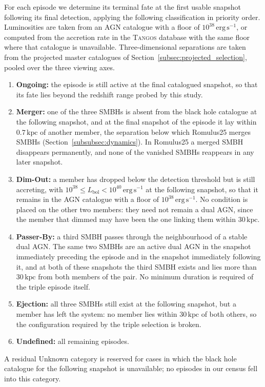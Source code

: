 \documentclass[twocolumn, 10pt]{article}
\begin{document}
For each episode we determine its terminal fate at the first usable snapshot following its final detection, applying the following classification in priority order. Luminosities are taken from an AGN catalogue with a floor of $10^{38}\,\mathrm{erg\,s^{-1}}$, or computed from the accretion rate in the \textsc{Tangos} database with the same floor where that catalogue is unavailable. Three-dimensional separations are taken from the projected master catalogues of Section~\ref{subsec:projected_selection}, pooled over the three viewing axes.
\begin{enumerate}
    \item \textbf{Ongoing:} the episode is still active at the final catalogued snapshot, so that its fate lies beyond the redshift range probed by this study.
    \item \textbf{Merger:} one of the three SMBHs is absent from the black hole catalogue at the following snapshot, and at the final snapshot of the episode it lay within $0.7\,\mathrm{kpc}$ of another member, the separation below which Romulus25 merges SMBHs (Section~\ref{subsubsec:dynamics}). In Romulus25 a merged SMBH disappears permanently, and none of the vanished SMBHs reappears in any later snapshot.
    \item \textbf{Dim-Out:} a member has dropped below the detection threshold but is still accreting, with $10^{38} \leq L_\mathrm{bol} < 10^{40}\,\mathrm{erg\,s^{-1}}$ at the following snapshot, so that it remains in the AGN catalogue with a floor of $10^{38}\,\mathrm{erg\,s^{-1}}$. No condition is placed on the other two members: they need not remain a dual AGN, since the member that dimmed may have been the one linking them within $30\,\mathrm{kpc}$.
    \item \textbf{Passer-By:} a third SMBH passes through the neighbourhood of a stable dual AGN. The same two SMBHs are an active dual AGN in the snapshot immediately preceding the episode and in the snapshot immediately following it, and at both of these snapshots the third SMBH exists and lies more than $30\,\mathrm{kpc}$ from both members of the pair. No minimum duration is required of the triple episode itself.
    \item \textbf{Ejection:} all three SMBHs still exist at the following snapshot, but a member has left the system: no member lies within $30\,\mathrm{kpc}$ of both others, so the configuration required by the triple selection is broken.
    \item \textbf{Undefined:} all remaining episodes.
\end{enumerate}
A residual Unknown category is reserved for cases in which the black hole catalogue for the following snapshot is unavailable; no episodes in our census fell into this category.
\end{document}
